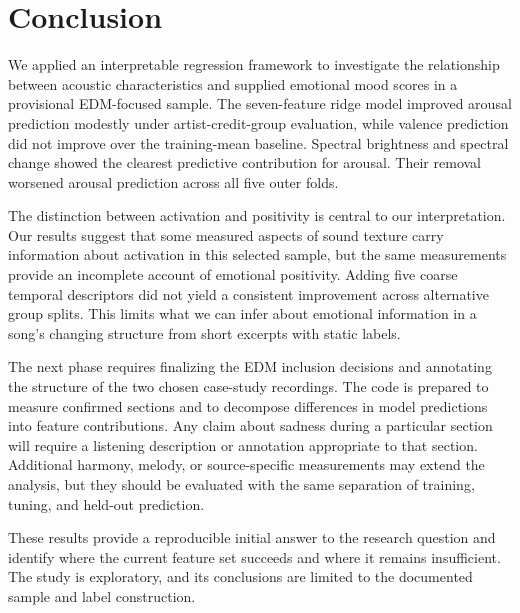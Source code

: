 \section{Conclusion}

We applied an interpretable regression framework to investigate the relationship between acoustic characteristics and supplied emotional mood scores in a provisional EDM-focused sample. The seven-feature ridge model improved arousal prediction modestly under artist-credit-group evaluation, while valence prediction did not improve over the training-mean baseline. Spectral brightness and spectral change showed the clearest predictive contribution for arousal. Their removal worsened arousal prediction across all five outer folds.

The distinction between activation and positivity is central to our interpretation. Our results suggest that some measured aspects of sound texture carry information about activation in this selected sample, but the same measurements provide an incomplete account of emotional positivity. Adding five coarse temporal descriptors did not yield a consistent improvement across alternative group splits. This limits what we can infer about emotional information in a song's changing structure from short excerpts with static labels.

The next phase requires finalizing the EDM inclusion decisions and annotating the structure of the two chosen case-study recordings. The code is prepared to measure confirmed sections and to decompose differences in model predictions into feature contributions. Any claim about sadness during a particular section will require a listening description or annotation appropriate to that section. Additional harmony, melody, or source-specific measurements may extend the analysis, but they should be evaluated with the same separation of training, tuning, and held-out prediction.

These results provide a reproducible initial answer to the research question and identify where the current feature set succeeds and where it remains insufficient. The study is exploratory, and its conclusions are limited to the documented sample and label construction.

